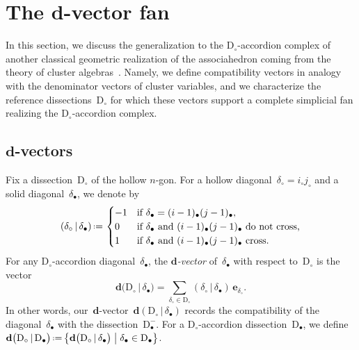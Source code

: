 \documentclass{amsart}
\theoremstyle{definition}
\renewcommand{\b}[1]{\mathbf{#1}} %
\newcommand{\bigset}[2]{\big\{ #1 \;\big|\; #2 \big\}} %
\newcommand{\eqdef}{\mbox{\,\raisebox{0.2ex}{\scriptsize\ensuremath{\mathrm:}}\ensuremath{=}\,}} %
\newcommand{\darkblue}{\color{darkblue}} %
\newcommand{\defn}[1]{\textsl{\darkblue #1}} %
\newcommand{\dissection}{\mathrm{D}} %
\newcommand{\comp}[2]{(#1 \,|\, #2)} %
\newcommand{\bigdvector}[2]{\mathbf{d} \big( #1  \,|\, #2 \big)} %
\newcommand{\bigdvectors}[2]{\mathbf{d} \big( #1  \,|\, #2 \big)} %
\newcommand{\mi}{-} %
\begin{document}

\section{The $\b{d}$-vector fan}
\label{sec:dvectorFan}

\enlargethispage{.3cm}
In this section, we discuss the generalization to the $\dissection_\circ$-accordion complex of another classical geometric realization of the associahedron coming from the theory of cluster algebras~\cite{FominZelevinsky-ClusterAlgebrasI, FominZelevinsky-ClusterAlgebrasII, ChapotonFominZelevinsky, CeballosSantosZiegler}. Namely, we define compatibility vectors in analogy with the denominator vectors of cluster variables, and we characterize the reference dissections~$\dissection_\circ$ for which these vectors support a complete simplicial fan realizing the $\dissection_\circ$-accordion complex.

\subsection{$\b{d}$-vectors}

Fix a dissection~$\dissection_\circ$ of the hollow $n$-gon. For a hollow diagonal~$\delta_\circ = i_\circ j_\circ$ and a solid diagonal~$\delta_\bullet$, we denote by
\[
\comp{\delta_\circ}{\delta_\bullet}
\eqdef
\begin{cases}
	-1 & \text{if } \delta_\bullet = (i-1)_\bullet (j-1)_\bullet, \\
	 0 & \text{if } \delta_\bullet \text{ and } (i-1)_\bullet (j-1)_\bullet \text{ do not cross,} \\
	 1 & \text{if } \delta_\bullet \text{ and } (i-1)_\bullet (j-1)_\bullet \text{ cross.}
\end{cases}
\]
For any $\dissection_\circ$-accordion diagonal~$\delta_\bullet$, the \defn{$\b{d}$-vector} of~$\delta_\bullet$ with respect to~$\dissection_\circ$ is the vector
\[
\bigdvector{\dissection_\circ}{\delta_\bullet} = \sum_{\delta_\circ \in \dissection_\circ} \comp{\delta_\circ}{\delta_\bullet} \, \b{e}_{\delta_\circ}.
\]
In other words, our~$\b{d}$-vector~$\b{d}(\dissection_\circ\,|\,\delta_\bullet)$ records the compatibility of the diagonal~$\delta_\bullet$ with the dissection~$\dissection_\bullet^\mi$. For a $\dissection_\circ$-accordion dissection~$\dissection_\bullet$, we define~$\bigdvectors{\dissection_\circ}{\dissection_\bullet} \eqdef \bigset{\bigdvector{\dissection_\circ}{\delta_\bullet}}{\delta_\bullet \in \dissection_\bullet}$.
\end{document}
